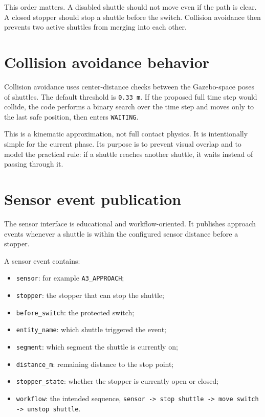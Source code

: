 \documentclass[12pt,a4paper]{report}
\newcommand{\codenext}[1]{\par\Needspace{#1\baselineskip}}
\begin{document}
This order matters. A disabled shuttle should not move even if the path is
clear. A closed stopper should stop a shuttle before the switch. Collision
avoidance then prevents two active shuttles from merging into each other.

\section{Collision avoidance behavior}

Collision avoidance uses center-distance checks between the Gazebo-space poses
of shuttles. The default threshold is \texttt{0.33 m}. If the proposed full
time step would collide, the code performs a binary search over the time step
and moves only to the last safe position, then enters \texttt{WAITING}.

\codenext{34}


This is a kinematic approximation, not full contact physics. It is intentionally
simple for the current phase. Its purpose is to prevent visual overlap and to
model the practical rule: if a shuttle reaches another shuttle, it waits instead
of passing through it.

\section{Sensor event publication}

The sensor interface is educational and workflow-oriented. It publishes
approach events whenever a shuttle is within the configured sensor distance
before a stopper.

\codenext{28}


A sensor event contains:

\begin{itemize}
\item \texttt{sensor}: for example \texttt{A3\_APPROACH};
\item \texttt{stopper}: the stopper that can stop the shuttle;
\item \texttt{before\_switch}: the protected switch;
\item \texttt{entity\_name}: which shuttle triggered the event;
\item \texttt{segment}: which segment the shuttle is currently on;
\item \texttt{distance\_m}: remaining distance to the stop point;
\item \texttt{stopper\_state}: whether the stopper is currently open or closed;
\item \texttt{workflow}: the intended sequence,
\texttt{sensor -> stop shuttle -> move switch -> unstop shuttle}.
\end{itemize}
\end{document}
